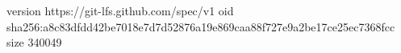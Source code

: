 version https://git-lfs.github.com/spec/v1
oid sha256:a8c83dfdd42be7018e7d7d52876a19e869caa88f727e9a2be17ce25ec7368fcc
size 340049
